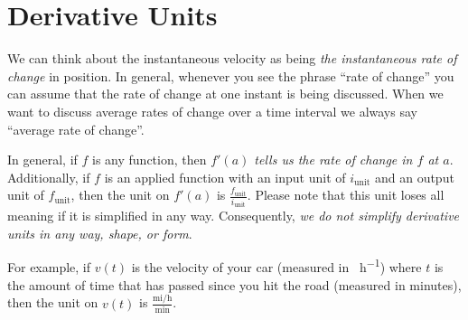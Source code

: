 \documentclass[10pt,oneside,]{book}
\theoremstyle{plain}
\theoremstyle{definition}
\numberwithin{equation}{section}
\newcommand{\fe}[2]{#1\mathopen{}\left(#2\right)\mathclose{}}
\newcommand{\fd}[1]{#1'}
\begin{document}
\section[Derivative Units]{Derivative Units}\label{section-derivative-units}
We can think about the instantaneous velocity as being \emph{the instantaneous rate of change} in position. In general, whenever you see the phrase ``rate of change'' you can assume that the rate of change at one instant is being discussed. When we want to discuss average rates of change over a time interval we always say ``average rate of change''.%
\par
In general, if \(f\) is any function, then \emph{\(\fe{\fd{f}}{a}\) tells us the rate of change in \(f\) at \(a\)}. Additionally, if \(f\) is an applied function with an input unit of \(i_{\text{unit}}\) and an output unit of \(f_{\text{unit}}\), then the unit on \(\fe{\fd{f}}{a}\) is \(\frac{f_{\text{unit}}}{i_{\text{unit}}}\). Please note that this unit loses all meaning if it is simplified in any way. Consequently, \emph{we do not simplify derivative units in any way, shape, or form}.%
\par
For example, if \(\fe{v}{t}\) is the velocity of your car (measured in \si{\mile\per\hour}) where \(t\) is the amount of time that has passed since you hit the road (measured in minutes), then the unit on \(\fe{v}{t}\) is \(\frac{\text{mi}/\text{h}}{\text{min}}\).%
\typeout{************************************************}
\typeout{************************************************}
\end{document}
